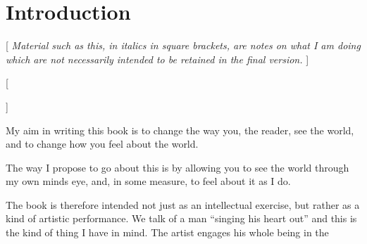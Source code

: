 
\def\wiki#1{#1\index{#1} \footnote{\href{http://wikipedia.org/wiki/#1}{http://wikpedia.org/wiki/#1}}}
\def\Wiki#1{\footnote{\href{http://wikipedia.org/wiki/#1}{http://wikpedia.org/wiki/#1}}}

\chapter{Introduction}

[{\it
Material such as this, in italics in square brackets, are notes on what I am doing which are not necessarily intended to be retained in the final version.
}]

[{\it

}]

My aim in writing this book is to change the way you, the reader, see the world, and to change how you feel about the world.

The way I propose to go about this is by allowing you to see the world through my own minds eye, and, in some measure, to feel about it as I do.

The book is therefore intended not just as an intellectual exercise, but rather as a kind of artistic performance.
We talk of a man ``singing his heart out'' and this is the kind of thing I have in mind.
The artist engages his whole being in the 
